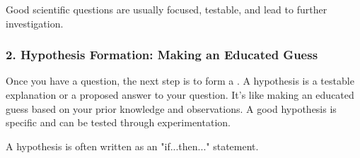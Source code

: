 Good scientific questions are usually focused, testable, and lead to further investigation.

\subsubsection{2. Hypothesis Formation: Making an Educated Guess}

Once you have a question, the next step is to form a . A hypothesis is a testable explanation or a proposed answer to your question.  It’s like making an educated guess based on your prior knowledge and observations. A good hypothesis is specific and can be tested through experimentation.


A hypothesis is often written as an "if...then..." statement.

